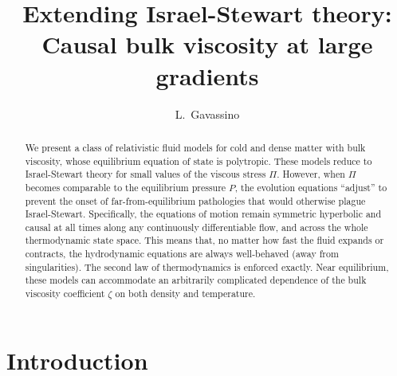 \documentclass[a4paper, amsfonts, amssymb, amsmath, reprint, showkeys, nofootinbib, twoside,notitlepage,onecolumn]{revtex4-2}
\theoremstyle{definition}
\theoremstyle{theorem}
\theoremstyle{corollary}
\begin{document}
\title{Extending Israel-Stewart theory: Causal bulk viscosity at large gradients}
\author{ L.~Gavassino}


\begin{abstract}
We present a class of relativistic fluid models for cold and dense matter with bulk viscosity, whose equilibrium equation of state is polytropic. These models reduce to Israel-Stewart theory for small values of the viscous stress $\Pi$. However, when $\Pi$ becomes comparable to the equilibrium pressure $P$, the evolution equations ``adjust'' to prevent the onset of far-from-equilibrium pathologies that would otherwise plague Israel-Stewart. Specifically, the equations of motion remain symmetric hyperbolic and causal at all times along any continuously differentiable flow, and across the whole thermodynamic state space. This means that, no matter how fast the fluid expands or contracts, the hydrodynamic equations are always well-behaved (away from singularities). The second law of thermodynamics is enforced exactly. Near equilibrium, these models can accommodate an arbitrarily complicated dependence of the bulk viscosity coefficient $\zeta$ on both density and temperature.
\end{abstract} 





\maketitle


\section{Introduction}\label{Introne}
\end{document}
